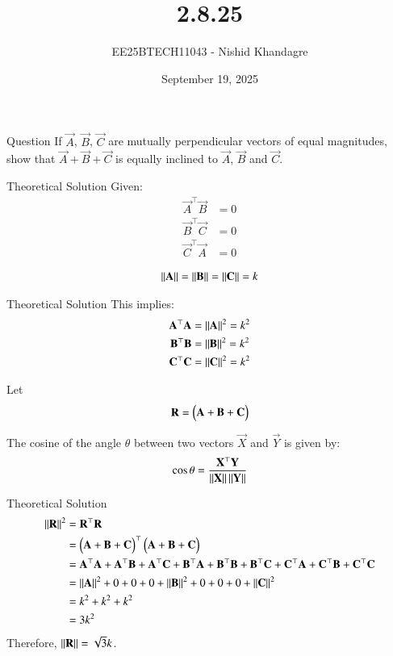 \documentclass{beamer}
\title
{2.8.25}
\date{September 19, 2025}
\author
{EE25BTECH11043 - Nishid Khandagre}
\begin{document}
\frame{\titlepage}

\begin{frame}{Question}
If $\vec{A}$, $\vec{B}$, $\vec{C}$ are mutually perpendicular vectors of equal magnitudes, show that $\vec{A}+\vec{B}+\vec{C}$ is equally inclined to $\vec{A}$, $\vec{B}$ and $\vec{C}$.
\end{frame}

\begin{frame}{Theoretical Solution}
Given:
\begin{align}
\vec{A}^\top \vec{B} &= 0 \\
\vec{B}^\top \vec{C} &= 0 \\
\vec{C}^\top \vec{A} &= 0
\end{align}

\begin{align}
\left\lVert\mathbf{A}\right\rVert = \left\lVert\mathbf{B}\right\rVert = \left\lVert\mathbf{C}\right\rVert = k
\end{align}
\end{frame}

\begin{frame}{Theoretical Solution}
This implies:
\begin{align}
\mathbf{A}^\top \mathbf{A} &= \left\lVert\mathbf{A}\right\rVert^2 = k^2 \\
\mathbf{B}^\top \mathbf{B} &= \left\lVert\mathbf{B}\right\rVert^2 = k^2 \\
\mathbf{C}^\top \mathbf{C} &= \left\lVert\mathbf{C}\right\rVert^2 = k^2
\end{align}

Let
\begin{align}
\mathbf{R} = \begin{pmatrix}\mathbf{A} + \mathbf{B} + \mathbf{C}\end{pmatrix}
\end{align}

The cosine of the angle $\theta$ between two vectors $\vec{X}$ and $\vec{Y}$ is given by:
\begin{align}
\cos \theta = \frac{\mathbf{X}^\top \mathbf{Y}}{\left\lVert\mathbf{X}\right\rVert\left\lVert\mathbf{Y}\right\rVert}
\label{eq:equation}
\end{align}
\end{frame}

\begin{frame}{Theoretical Solution}
\begin{align}
\left\lVert\mathbf{R}\right\rVert^2 &= \mathbf{R}^\top \mathbf{R} \\
&=\begin{pmatrix}\mathbf{A} + \mathbf{B} + \mathbf{C}\end{pmatrix}^\top\begin{pmatrix}\mathbf{A} + \mathbf{B} + \mathbf{C}\end{pmatrix} \\
&=\mathbf{A}^\top\mathbf{A}+\mathbf{A}^\top\mathbf{B}+\mathbf{A}^\top\mathbf{C}+\mathbf{B}^\top\mathbf{A}+\mathbf{B}^\top\mathbf{B}+\mathbf{B}^\top\mathbf{C}+\mathbf{C}^\top\mathbf{A}+\mathbf{C}^\top\mathbf{B}+\mathbf{C}^\top\mathbf{C} \\
&=\left\lVert\mathbf{A}\right\rVert^2 + 0 + 0 + 0 + \left\lVert\mathbf{B}\right\rVert^2 + 0 + 0 + 0 + \left\lVert\mathbf{C}\right\rVert^2 \\
&=k^2 + k^2 + k^2\\
&=3k^2
\end{align}
Therefore, $\left\lVert\mathbf{R}\right\rVert = \sqrt{3}k$.
\end{frame}
\end{document}
